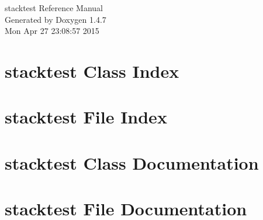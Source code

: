 \documentclass[a4paper]{book}
\begin{document}
\begin{titlepage}
\vspace*{7cm}
\begin{center}
{\Large stacktest Reference Manual}\\
\vspace*{1cm}
{\large Generated by Doxygen 1.4.7}\\
\vspace*{0.5cm}
{\small Mon Apr 27 23:08:57 2015}\\
\end{center}
\end{titlepage}
\clearemptydoublepage
{}
\tableofcontents
\clearemptydoublepage
{}
\chapter{stacktest Class Index}

\chapter{stacktest File Index}

\chapter{stacktest Class Documentation}





\chapter{stacktest File Documentation}










\printindex
\end{document}
